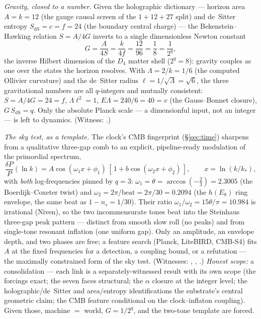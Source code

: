 \documentclass[11pt]{article}
\begin{document}
\emph{Gravity, closed to a number.} Given the holographic dictionary --- horizon area
$A=k=12$ (the gauge causal screen of the $1{+}12{+}27$ split) and de~Sitter entropy
$S_{\mathrm{dS}}=c=f=24$ (the boundary central charge) --- the Bekenstein--Hawking
relation $S=A/4G$ inverts to a single dimensionless Newton constant
\[
G=\frac{A}{4S}=\frac{k}{4f}=\frac{12}{96}=\frac18=\frac1{2^q},
\]
the inverse Hilbert dimension of the $D_4$ matter shell ($2^q=8$): gravity couples as
one over the states the horizon resolves. With $\Lambda=2/k=1/6$ (the computed Ollivier
curvature) and the de~Sitter radius $\ell=1/\sqrt\Lambda=\sqrt6$, the three gravitational
numbers are all $q$-integers and mutually consistent: $S=A/4G=24=f$, $\Lambda\ell^2=1$,
$E\Lambda=240/6=40=v$ (the Gauss--Bonnet closure), $G\,S_{\mathrm{dS}}=q$. Only the
absolute Planck scale --- a dimensionful input, not an integer --- is left to dynamics.
(Witness: .)

\emph{The sky test, as a template.} The clock's CMB fingerprint
(\S\ref{sec:time}) sharpens from a qualitative three-gap comb to an explicit,
pipeline-ready modulation of the primordial spectrum,
\[
\frac{\delta P}{P}(\ln k)=A\cos(\omega_1 x+\phi_1)\,[\,1+b\cos(\omega_2 x+\phi_2)\,],
\qquad x=\ln(k/k_\ast),
\]
with \emph{both} log-frequencies pinned by $q=3$: $\omega_1=\theta=\arccos(-\tfrac23)
=2.3005$ (the Boerdijk--Coxeter twist) and $\omega_2=2\pi/\mathrm{beat}=2\pi/30=0.2094$
(the $h(E_8)$ ring envelope, the same beat as $1-n_s=1/30$). Their ratio
$\omega_1/\omega_2=15\theta/\pi=10.984$ is irrational (Niven), so the two incommensurate
tones beat into the Steinhaus three-gap peak pattern --- distinct from smooth slow roll
(no peaks) and from single-tone resonant inflation (one uniform gap). Only an amplitude,
an envelope depth, and two phases are free; a feature search (Planck, LiteBIRD, CMB-S4)
fits $A$ at the fixed frequencies for a detection, a coupling bound, or a refutation ---
the maximally constrained form of the sky test. (Witnesses:
, ,
.) \emph{Honest scope:} a consolidation --- each
link is a separately-witnessed result with its own scope (the forcings exact; the seven
faces structural; the $\alpha$ closure at the integer level; the holographic/de~Sitter
and area/entropy identifications the substrate's central geometric claim; the CMB
feature conditional on the clock--inflaton coupling). Given those, machine $=$ world,
$G=1/2^q$, and the two-tone template are forced.
\end{document}
